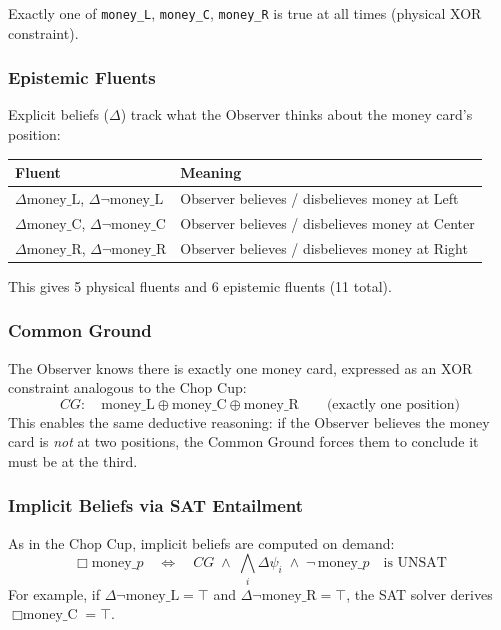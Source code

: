 \documentclass[11pt]{article}
\newcommand{\EBel}[1]{\ensuremath{\Delta #1}} %
\newcommand{\IBel}[1]{\ensuremath{\Box #1}}   %
\newcommand{\CG}{\ensuremath{\mathit{CG}}}    %
\begin{document}
Exactly one of \texttt{money\_L}, \texttt{money\_C}, \texttt{money\_R} is true at all times (physical XOR constraint).

\subsubsection{Epistemic Fluents}

Explicit beliefs ($\Delta$) track what the Observer thinks about the money card's position:

\begin{center}
\begin{tabular}{ll}
\toprule
\textbf{Fluent} & \textbf{Meaning} \\
\midrule
$\EBel{\text{money\_L}}$, $\EBel{\neg\text{money\_L}}$ & Observer believes / disbelieves money at Left \\
$\EBel{\text{money\_C}}$, $\EBel{\neg\text{money\_C}}$ & Observer believes / disbelieves money at Center \\
$\EBel{\text{money\_R}}$, $\EBel{\neg\text{money\_R}}$ & Observer believes / disbelieves money at Right \\
\bottomrule
\end{tabular}
\end{center}

This gives 5 physical fluents and 6 epistemic fluents (11 total).

\subsubsection{Common Ground}

The Observer knows there is exactly one money card, expressed as an XOR constraint analogous to the Chop Cup:
\[
    \CG: \quad \text{money\_L} \oplus \text{money\_C} \oplus \text{money\_R}
    \qquad \text{(exactly one position)}
\]
This enables the same deductive reasoning: if the Observer believes the money card is \emph{not} at two positions, the Common Ground forces them to conclude it must be at the third.

\subsubsection{Implicit Beliefs via SAT Entailment}

As in the Chop Cup, implicit beliefs are computed on demand:
\[
    \IBel{\text{money}\_p} \quad \iff \quad \CG \;\land\; \bigwedge_i \EBel{\psi_i} \;\land\; \neg\,\text{money}\_p \quad \text{is UNSAT}
\]
For example, if $\EBel{\neg\text{money\_L}} = \top$ and $\EBel{\neg\text{money\_R}} = \top$, the SAT solver derives $\IBel{\text{money\_C}} = \top$.
\end{document}
